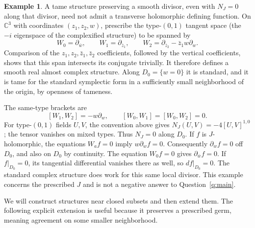 \documentclass[11pt]{article}
\theoremstyle{definition}
\newtheorem{example}[theorem]{Example}
\theoremstyle{remark}
\newcommand{\C}{\mathbb C}
\begin{document}
\begin{example}\label{ex:badJ}
A tame structure preserving a smooth divisor, even with $N_J=0$ along that divisor, need not admit a transverse holomorphic defining function.
On $\C^3$ with coordinates $(z_1,z_2,w)$, prescribe the type-$(0,1)$ tangent space (the $-i$ eigenspace of the complexified structure) to be spanned by
\[
 W_0=\partial_{\bar w},\qquad W_1=\partial_{\bar z_1},\qquad
 W_2=\partial_{\bar z_2}-\bar z_1w\partial_w.
\]
Comparison of the $z_1,z_2,\bar z_1,\bar z_2$ coefficients, followed by the vertical coefficients, shows that this span intersects its conjugate trivially. It therefore defines a smooth real almost complex structure. Along $D_0=\{w=0\}$ it is standard, and it is tame for the standard symplectic form in a sufficiently small neighborhood of the origin, by openness of tameness.

The same-type brackets are
\[
 [W_1,W_2]=-w\partial_w,\qquad [W_0,W_1]=[W_0,W_2]=0.
\]
For type-$(0,1)$ fields $U,V$, the convention above gives
$N_J(U,V)=-4[U,V]^{1,0}$; the tensor vanishes on mixed types. Thus $N_J=0$ along $D_0$.
If $f$ is $J$-holomorphic, the equations $W_af=0$ imply $w\partial_wf=0$. 
Consequently $\partial_wf=0$ off $D_0$, and also on $D_0$ by continuity. The equation $W_0f=0$ gives $\partial_{\bar w}f=0$. If $f|_{D_0}=0$, its tangential differential vanishes there as well, so $df|_{D_0}=0$.
The standard complex structure does work for this same local divisor. This example concerns the prescribed $J$ and is not a negative answer to Question~\ref{q:main}.
\end{example}

We will construct structures near closed subsets and then extend them. The following explicit extension is useful because it preserves a prescribed germ, meaning agreement on some smaller neighborhood.
\end{document}
